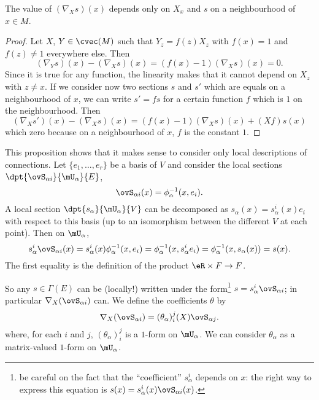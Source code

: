 \begin{proposition}     \label{PROPooWZYOooEVhgFt}
The value of $(\nabla_Xs)(x)$ depends only on $X_x$ and $s$ on a neighbourhood of $x\in M$.
\end{proposition}

\begin{proof}
Let $X$, $Y\in\cvec(M)$ such that $Y_z=f(z)X_z$  with $f(x)=1$ and $f(z)\neq 1$ everywhere else. Then
\[
  (\nabla_Ys)(x)-(\nabla_Xs)(x)=(f(x)-1)(\nabla_Xs)(x)=0.
\]
Since it is true for any function, the linearity makes that it cannot depend on $X_z$ with $z\neq x$. If we consider now two sections $s$ and $s'$ which are equals on a neighbourhood of $x$, we can write $s'=fs$ for a certain function $f$ which is $1$ on the neighbourhood. Then
\[
  (\nabla_Xs')(x)-(\nabla_Xs)(x)=(f(x)-1)(\nabla_Xs)(x)+(Xf)s(x)
\]
which zero because on a neighbourhood of $x$, $f$ is the constant $1$.
\end{proof}

This proposition shows that it makes sense to consider only local descriptions of connections.  Let $\{e_1,\ldots,e_r\}$ be a basis of $V$ and consider the local sections $\dpt{\ovS_{\alpha i}}{\mU_{\alpha}}{E}$,
\[
  \ovS_{\alpha i}(x)=\phi_{\alpha}^{-1}(x,e_i).
\]
A local section $\dpt{s_{\alpha}}{\mU_{\alpha}}{V}$ can be decomposed as $s_{\alpha}(x)=s_{\alpha}^i(x)e_i$ with respect to this basis (up to an isomorphism between the different $V$ at each point). Then on $\mU_{\alpha}$,
\begin{equation}
  s_{\alpha}^i\ovS_{\alpha i}(x)=s_{\alpha}^i(x)\phi_{\alpha}^{-1}(x,e_i)
                              =\phi_{\alpha}^{-1}(x,s_{\alpha}^ie_i)
			      =\phi_{\alpha}^{-1}(x,s_{\alpha}(x))
			      =s(x).
\end{equation}
The first equality is the definition of the product $\eR\times F\to F$.

So any $s\in\Gamma(E)$ can be (locally!) written under the form\footnote{be careful on the fact that the ``coefficient'' $s_{\alpha}^i$ depends on $x$: the right way to express this equation is $s(x)=s^i_{\alpha}(x)\ovS_{\alpha i}(x)$.} $s=s_{\alpha}^i\ovS_{\alpha i}$; in particular $\nabla_X(\ovS_{\alpha i})$ can. We define the coefficients $\theta$ by
\begin{equation}
 \nabla_X(\ovS_{\alpha i})=(\theta_{\alpha})^j_i(X)\ovS_{\alpha j}.
\end{equation}
where, for each $i$ and $j$, $(\theta_{\alpha})^j_i$ is a $1$-form on $\mU_{\alpha}$. We can consider $\theta_{\alpha}$ as a matrix-valued $1$-form on $\mU_{\alpha}$.

